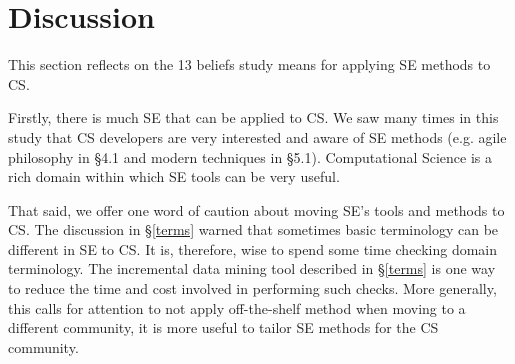 \documentclass[sigconf]{acmart}
\begin{document}




\section{Discussion}
This section reflects on the 13 beliefs study means for
applying SE methods to CS.

Firstly, there is much SE that can be applied to CS. We saw many times in this study that CS developers are very interested and aware of SE methods (e.g. agile philosophy in \S4.1 and modern techniques in \S5.1). Computational Science is a rich domain within which SE tools can be very useful.

That said,  we offer one word of caution about moving SE's tools and methods to CS. The discussion in \S\ref{terms} warned that sometimes basic terminology can be different in SE to CS. It is, therefore, wise to spend some time checking domain terminology. The incremental data mining tool described in \S\ref{terms} is one way to reduce the time and cost
involved in performing such checks. More generally, this calls for attention to not apply off-the-shelf method when moving to a different community, it is more useful to tailor SE methods for the CS community.
\end{document}
